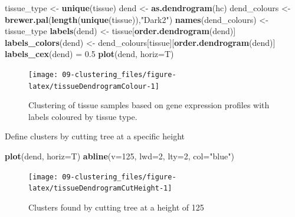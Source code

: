 \documentclass[]{book}
\newenvironment{Shaded}{\begin{snugshade}}{\end{snugshade}}
\newcommand{\KeywordTok}[1]{\textcolor[rgb]{0.13,0.29,0.53}{\textbf{{#1}}}}
\newcommand{\DataTypeTok}[1]{\textcolor[rgb]{0.13,0.29,0.53}{{#1}}}
\newcommand{\DecValTok}[1]{\textcolor[rgb]{0.00,0.00,0.81}{{#1}}}
\newcommand{\FloatTok}[1]{\textcolor[rgb]{0.00,0.00,0.81}{{#1}}}
\newcommand{\StringTok}[1]{\textcolor[rgb]{0.31,0.60,0.02}{{#1}}}
\newcommand{\NormalTok}[1]{{#1}}
\theoremstyle{definition}
\theoremstyle{definition}
\theoremstyle{definition}
\theoremstyle{remark}
\begin{document}
\begin{Shaded}
\begin{Highlighting}[]
\NormalTok{tissue_type <-}\StringTok{ }\KeywordTok{unique}\NormalTok{(tissue)}
\NormalTok{dend <-}\StringTok{ }\KeywordTok{as.dendrogram}\NormalTok{(hc)}
\NormalTok{dend_colours <-}\StringTok{ }\KeywordTok{brewer.pal}\NormalTok{(}\KeywordTok{length}\NormalTok{(}\KeywordTok{unique}\NormalTok{(tissue)),}\StringTok{"Dark2"}\NormalTok{)}
\KeywordTok{names}\NormalTok{(dend_colours) <-}\StringTok{ }\NormalTok{tissue_type}
\KeywordTok{labels}\NormalTok{(dend) <-}\StringTok{ }\NormalTok{tissue[}\KeywordTok{order.dendrogram}\NormalTok{(dend)]}
\KeywordTok{labels_colors}\NormalTok{(dend) <-}\StringTok{ }\NormalTok{dend_colours[tissue][}\KeywordTok{order.dendrogram}\NormalTok{(dend)]}
\KeywordTok{labels_cex}\NormalTok{(dend) =}\StringTok{ }\FloatTok{0.5}
\KeywordTok{plot}\NormalTok{(dend, }\DataTypeTok{horiz=}\NormalTok{T)}
\end{Highlighting}
\end{Shaded}

\begin{figure}

{\centering \texttt{[image: 09-clustering\_files/figure-latex/tissueDendrogramColour-1]} 

}

\caption{Clustering of tissue samples based on gene expression profiles with labels coloured by tissue type. }\label{fig:tissueDendrogramColour}
\end{figure}

Define clusters by cutting tree at a specific height

\begin{Shaded}
\begin{Highlighting}[]
\KeywordTok{plot}\NormalTok{(dend, }\DataTypeTok{horiz=}\NormalTok{T)}
\KeywordTok{abline}\NormalTok{(}\DataTypeTok{v=}\DecValTok{125}\NormalTok{, }\DataTypeTok{lwd=}\DecValTok{2}\NormalTok{, }\DataTypeTok{lty=}\DecValTok{2}\NormalTok{, }\DataTypeTok{col=}\StringTok{"blue"}\NormalTok{)}
\end{Highlighting}
\end{Shaded}

\begin{figure}

{\centering \texttt{[image: 09-clustering\_files/figure-latex/tissueDendrogramCutHeight-1]} 

}

\caption{Clusters found by cutting tree at a height of 125}\label{fig:tissueDendrogramCutHeight}
\end{figure}
\end{document}
